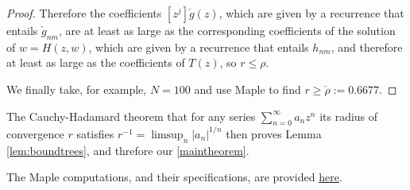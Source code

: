 \documentclass{amsart}
\theoremstyle{plain}
\begin{document}
\begin{proof}
Therefore the coefficients $[z^j]\check{g}(z)$, which are given by a recurrence that entails $\check{g}_{nm}$, 
 are at least as large as the corresponding coefficients of the solution of $w = H(z,w)$, which are given by a recurrence that entails $h_{nm}$, 
 and therefore at least as large as the coefficients of $T(z)$, so $r \leq \rho$.
 
 
 
   
   We finally take, for example, $N=100$ and use Maple to find $r \geq \check{\rho} := 0.6677.$ \end{proof}   
  
  
The Cauchy-Hadamard theorem that for any series $\sum_{n=0}^{\infty}a_nz^n$ its radius of convergence $r$  satisfies $ r^{-1} = \limsup_n |a_n|^{1/n}$ then proves  Lemma \ref{lem:boundtrees}, and threfore  our \ref{maintheorem}.


The Maple computations, and their specifications, are provided \href{https://drive.google.com/file/d/1ZRTi95dtOXLDpn2KKEApK2Q1sPOTVK5k/view?usp=sharing}{here}.

  
\end{document}
